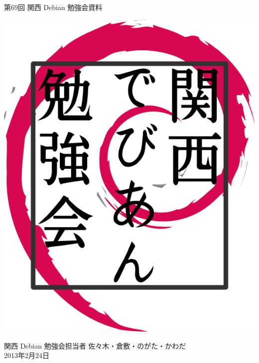 \documentclass[mingoth,a4paper]{jsarticle}
\newcommand{\debmtgyear}{2013}
\newcommand{\debmtgdate}{24}
\newcommand{\debmtgmonth}{2}
\newcommand{\debmtgnumber}{69}
\begin{document}
\begin{titlepage}


 第\debmtgnumber{}回 関西 Debian 勉強会資料

\vspace{2cm}

\begin{center}
\includegraphics{image200802/kansaidebianlogo.png}
\end{center}

\begin{flushright}
\hfill{}関西 Debian 勉強会担当者 佐々木・倉敷・のがた・かわだ \\
\hfill{}\debmtgyear{}年\debmtgmonth{}月\debmtgdate{}日
\end{flushright}

\thispagestyle{empty}
\end{titlepage}


\vspace{1em}
\end{document}
